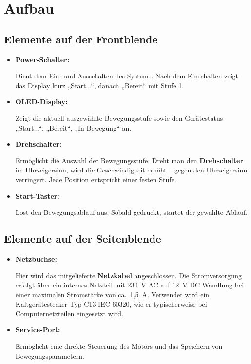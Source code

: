 \documentclass[a4paper,12pt,final]{report}
\begin{document}
	\section {Aufbau}
	\subsection {Elemente auf der Frontblende }
	\begin{itemize}[leftmargin=1.5em]
		
		\item \textbf{Power-Schalter:}
		
		Dient dem Ein- und Ausschalten des Systems. Nach dem Einschalten zeigt das Display kurz „Start...“, danach „Bereit“ mit Stufe 1. \\
		
		\item \textbf{OLED-Display:} 
		
		Zeigt die aktuell ausgewählte Bewegungsstufe sowie den Gerätestatus „Start...“, „Bereit“, „In Bewegung“ an.\\
		
		\item \textbf{Drehschalter:} 
		
		Ermöglicht die Auswahl der Bewegungsstufe. Dreht man den \textbf{Drehschalter} im Uhrzeigersinn, wird die Geschwindigkeit erhöht – gegen den Uhrzeigersinn verringert. Jede Position entspricht einer festen Stufe.\\
		
		\item \textbf{Start-Taster:}
		
		Löst den Bewegungsablauf aus. Sobald gedrückt, startet der gewählte Ablauf.\\ 
		
	\end{itemize}
	\newpage
	
	\subsection{Elemente auf der Seitenblende}
	\begin{itemize}[leftmargin=1.5em]
		
		\item \textbf{Netzbuchse:}
		
		Hier wird das mitgelieferte \textbf{Netzkabel} angeschlossen. Die Stromversorgung erfolgt über ein internes Netzteil mit 230~V AC auf 12~V DC Wandlung bei einer maximalen Stromstärke von ca.\ 1{,}5~A. Verwendet wird ein Kaltgerätestecker Typ C13 IEC 60320, wie er typischerweise bei Computernetzteilen eingesetzt wird.

		
		\item \textbf{Service-Port:}
		
		Ermöglicht eine direkte Steuerung des Motors und das Speichern von Bewegungsparametern.\\
		
	\end{itemize}
	
\end{document}
